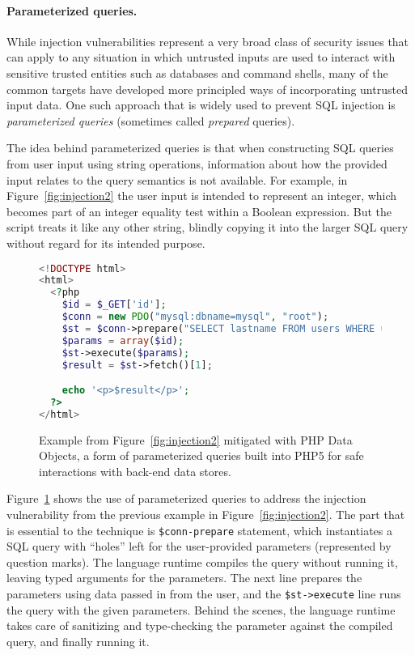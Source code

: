 \documentclass[11pt,twoside]{scrartcl}
\begin{document}
\paragraph{Parameterized queries.}

While injection vulnerabilities represent a very broad class of security issues that can apply to any situation in which untrusted inputs are used to interact with sensitive trusted entities such as databases and command shells, many of the common targets have developed more principled ways of incorporating untrusted input data. One such approach that is widely used to prevent SQL injection is \emph{parameterized queries} (sometimes called \emph{prepared} queries).

The idea behind parameterized queries is that when constructing SQL queries from user input using string operations, information about how the provided input relates to the query semantics is not available. For example, in Figure~\ref{fig:injection2} the user input is intended to represent an integer, which becomes part of an integer equality test within a Boolean expression. But the script treats it like any other string, blindly copying it into the larger SQL query without regard for its intended purpose.

\begin{figure}
\begin{lstlisting}[language=PHP]
<!DOCTYPE html>
<html>
  <?php 
    $id = $_GET['id'];
    $conn = new PDO("mysql:dbname=mysql", "root");
    $st = $conn->prepare("SELECT lastname FROM users WHERE userid = ?");
    $params = array($id);
    $st->execute($params);
    $result = $st->fetch()[1];

    echo '<p>$result</p>';
  ?>
</html>
\end{lstlisting}

\caption{\label{fig:paramquery} Example from Figure~\ref{fig:injection2} mitigated with PHP Data Objects, a form of parameterized queries built into PHP5 for safe interactions with back-end data stores.}
\end{figure}

Figure~\ref{fig:paramquery} shows the use of parameterized queries to address the injection vulnerability from the previous example in Figure~\ref{fig:injection2}. The part that is essential to the technique is \verb'$conn-prepare' statement, which instantiates a SQL query with ``holes'' left for the user-provided parameters (represented by question marks). The language runtime compiles the query without running it, leaving typed arguments for the parameters. The next line prepares the parameters using data passed in from the user, and the \verb'$st->execute' line runs the query with the given parameters. Behind the scenes, the language runtime takes care of sanitizing and type-checking the parameter against the compiled query, and finally running it.
\end{document}
